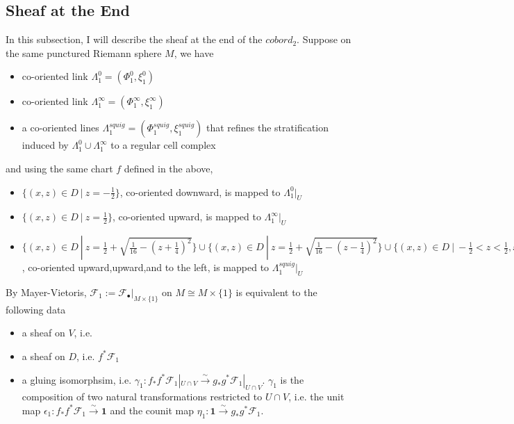 \subsection{Sheaf at the End}
In this subsection, I will describe the sheaf at the end of the $cobord_2$. Suppose on the same punctured Riemann sphere $M$, we have 
\begin{itemize}
\item co-oriented link $\Lambda_1^0 = (\Phi_1^0,\xi_1^0)$

\item co-oriented link $\Lambda_1^\infty = (\Phi_1^\infty,\xi _1^\infty)$

\item a co-oriented lines $\Lambda_1^{squig} = (\Phi_1^{squig}, \xi_1^{squig})$ that refines the stratification induced by $\Lambda_1^0 \cup \Lambda_1^\infty$ to a regular cell complex 
\end{itemize}
and using the same chart $f$ defined in the above,
\begin{itemize}
\item $\{(x,z)\in D ~|~ z = -\frac{1}{2} \}$, co-oriented downward, is mapped to $\Lambda_1^0 |_{U}$

\item $\{(x,z)\in D ~|~ z = \frac{1}{2} \}$, co-oriented upward, is mapped to $\Lambda_1^\infty |_{U}$

\item $\{(x,z)\in D ~|~ z=\frac{1}{2} + \sqrt{\frac{1}{16} - (z+\frac{1}{4})^2} \} \cup \{(x,z)\in D ~|~ z=\frac{1}{2} + \sqrt{\frac{1}{16} - (z-\frac{1}{4})^2}\} \cup \{(x,z)\in D ~|~ -\frac{1}{2}< z < \frac{1}{2}, x = 0 \}$, co-oriented upward,upward,and to the left, is mapped to $\Lambda_1^{squig} |_{U}$
\end{itemize}
By Mayer-Vietoris, $\mathscr{F}_1:= \mathscr{F}_\bullet|_{M\times\{1\}}$ on $M \cong M\times\{1\}$ is equivalent to the following data
\begin{itemize}
\item a sheaf on $V$, i.e. 

\item a sheaf on $D$, i.e. $f^*\mathscr{F}_1$

\item a gluing isomorphsim, i.e. $\gamma_1 : f_*f^*\mathscr{F}_1|_{U\cap V} \xrightarrow{\sim} g_*g^*\mathscr{F}_1|_{U\cap V}$. $\gamma_1$ is the composition of two natural transformations restricted to $U \cap V$, i.e. the unit map $\epsilon_1:f_*f^*\mathscr{F}_1 \xrightarrow{\sim} \textbf{1}$ and the counit map $\eta_1 : \textbf{1} \xrightarrow{\sim} g_*g^*\mathscr{F}_1$.
\end{itemize}

